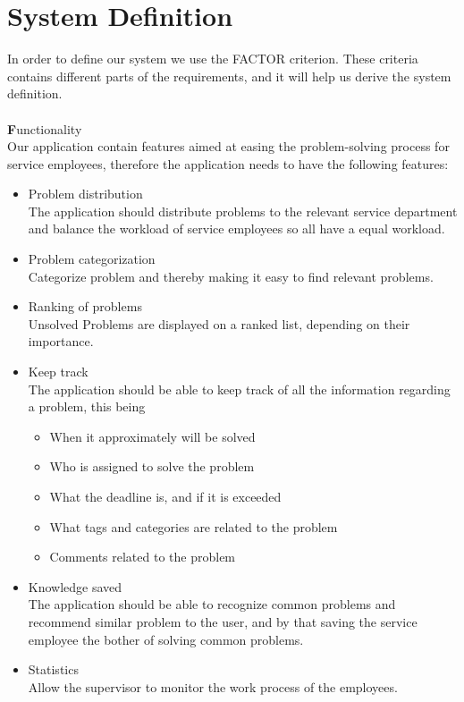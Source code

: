 \section{System Definition}
\label{sec:factor}
\label{sec:systemdefinition}
In order to define our system we use the FACTOR criterion\cite[p.~39]{roedeaalborg}. These criteria contains different parts of the requirements, and it will help us derive the system definition.  \\
\ \\
{\Large \textbf{F}}unctionality \\
Our application contain features aimed at easing the problem-solving process for service employees, therefore the application needs to have the following features:
\begin{itemize}
\item Problem distribution\\
The application should distribute problems to the relevant service department and balance the workload of service employees so all have a equal workload. 
\item Problem categorization \\
Categorize problem and thereby making it easy to find relevant problems.
\item Ranking of problems \\
Unsolved Problems are displayed on a ranked list, depending on their importance.
\item Keep track \\
The application should be able to keep track of all the information regarding a problem, this being
\begin{itemize}
	\item When it approximately will be solved
	\item Who is assigned to solve the problem
	\item What the deadline is, and if it is exceeded
	\item What tags and categories are related to the problem 
	\item Comments related to the problem
\end{itemize}
\item Knowledge saved \\
The application should be able to recognize common problems and recommend similar problem to the user, and by that saving the service employee the bother of solving common problems. 
\item Statistics \\
Allow the supervisor to monitor the work process of the employees.
\end{itemize}
